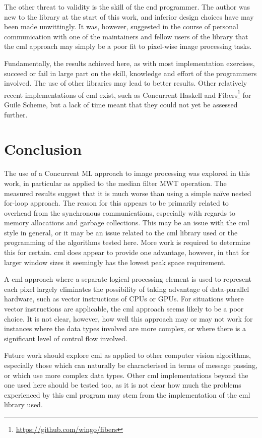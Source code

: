 The other threat to validity is the skill of the end programmer.  The author was new to the \hopac{} library at the start of this work, and inferior design choices have may been made unwittingly.  It was, however, suggested in the course of personal communication with one of the maintainers and fellow users of the \hopac{} library that the \gls{cml} approach may simply be a poor fit to pixel-wise image processing tasks.

Fundamentally, the results achieved here, as with most implementation exercises, succeed or fail in large part on the skill, knowledge and effort of the programmers involved.  The use of other libraries may lead to better results.  Other relatively recent implementations of \gls{cml} exist, such as Concurrent Haskell \cite{Chaudhuri2009} and Fibers\footnote{\url{https://github.com/wingo/fibers}} for Guile Scheme, but a lack of time meant that they could not yet be assessed further.

\section{Conclusion}
The use of a Concurrent ML approach to image processing was explored in this work, in particular as applied to the median filter MWT operation.  The measured results suggest that it is much worse than using a simple naïve nested for-loop approach.  The reason for this appears to be primarily related to overhead from the synchronous communications, especially with regards to memory allocations and garbage collections.  This may be an issue with the \gls{cml} style in general, or it may be an issue related to the \gls{cml} library used or the programming of the algorithms tested here.  More work is required to determine this for certain.  \gls{cml} does appear to provide one advantage, however, in that for larger window sizes it seemingly has the lowest peak space requirement.

A \gls{cml} approach where a separate logical processing element is used to represent each pixel largely eliminates the possibility of taking advantage of data-parallel hardware, such as vector instructions of CPUs or GPUs.  For situations where vector instructions are applicable, the \gls{cml} approach seems likely to be a poor choice.  It is not clear, however, how well this approach may or may not work for instances where the data types involved are more complex, or where there is a significant level of control flow involved.

Future work should explore \gls{cml} as applied to other computer vision algorithms, especially those which can naturally be characterised in terms of message passing, or which use more complex data types.  Other \gls{cml} implementations beyond the one used here should be tested too, as it is not clear how much the problems experienced by this \gls{cml} program may stem from the implementation of the \gls{cml} library used.